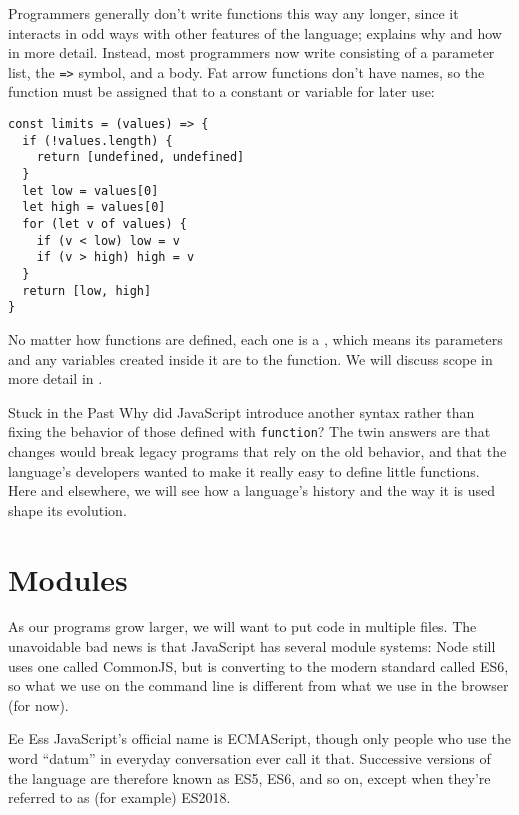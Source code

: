 Programmers generally don't write functions this way any longer,
since it interacts in odd ways with other features of the language;
 explains why and how in more detail.
Instead,
most programmers now write 
consisting of a parameter list,
the \texttt{=\textgreater{}} symbol,
and a body.
Fat arrow functions don't have names,
so the function must be assigned that to a constant or variable for later use:

\begin{verbatim}
const limits = (values) => {
  if (!values.length) {
    return [undefined, undefined]
  }
  let low = values[0]
  let high = values[0]
  for (let v of values) {
    if (v < low) low = v
    if (v > high) high = v
  }
  return [low, high]
}
\end{verbatim}

No matter how functions are defined,
each one is a ,
which means its parameters and any variables created inside it are  to the function.
We will discuss scope in more detail in .

\begin{aside}{Stuck in the Past}
  Why did JavaScript introduce another syntax
  rather than fixing the behavior of those defined with \texttt{function}?
  The twin answers are that changes would break legacy programs that rely on the old behavior,
  and that the language's developers wanted to make it really easy to define little functions.
  Here and elsewhere,
  we will see how a language's history and the way it is used shape its evolution.
\end{aside}

\section{Modules}\label{s:basics-modules}

As our programs grow larger,
we will want to put code in multiple files.
The unavoidable bad news is that JavaScript has several module systems:
Node still uses one called CommonJS,
but is converting to the modern standard called ES6,
so what we use on the command line is different from what we use in the browser (for now).

\begin{aside}{Ee Ess}
  JavaScript's official name is ECMAScript,
  though only people who use the word ``datum'' in everyday conversation ever call it that.
  Successive versions of the language are therefore known as ES5, ES6, and so on,
  except when they're referred to as (for example) ES2018.
\end{aside}

